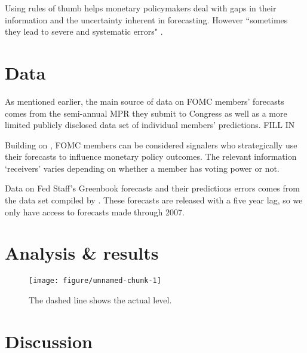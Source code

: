 \documentclass[a4paper]{article}\usepackage[]{graphicx}\usepackage[]{color}
\newenvironment{knitrout}{}{} %
\begin{document}
Using rules of thumb helps monetary policymakers deal with gaps in their information and the uncertainty inherent in forecasting.  However ``sometimes they lead to severe and systematic errors" \citep[][1124]{tverskykahneman1974}.

\section{Data}

As mentioned earlier, the main source of data on FOMC members' forecasts comes from the semi-annual MPR they submit to Congress as well as a more limited publicly disclosed data set of individual members' predictions. FILL IN

Building on \cite{Tillmann2011}, FOMC members can be considered signalers who strategically use their forecasts to influence monetary policy outcomes. The relevant information `receivers' varies depending on whether a member has voting power or not.  

Data on Fed Staff's Greenbook forecasts and their predictions errors comes from the data set compiled by \cite{gandrud2013does}. These forecasts are released with a five year lag, so we only have access to forecasts made through 2007.


\section{Analysis \& results}

\begin{figure}

\begin{knitrout}
\color{fgcolor}

{\centering \texttt{[image: figure/unnamed-chunk-1]} 

}



\end{knitrout}


{\scriptsize{The dashed line shows the actual level.}}

\end{figure}

\section*{Discussion}



\clearpage



\end{document}
